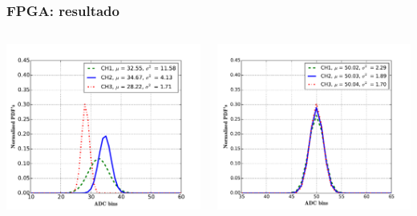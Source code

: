 \documentclass{beamer}
\begin{document}
\begin{frame}
  \frametitle{FPGA: resultado}
	\begin{columns}
	\begin{column}{0.50\textwidth}
  \begin{block}{}
    \begin{center}
    \includegraphics[width=\textwidth]{d5/histogramas_por_canal_fija}
    \end{center}
  \end{block}
	\end{column}
	\begin{column}{0.50\textwidth}
  \begin{block}{}
    \begin{center}
    \includegraphics[width=\textwidth]{d5/histogramas_por_canal_normal}
    \end{center}
  \end{block}
	\end{column}
  \end{columns}
\end{frame}
\end{document}
